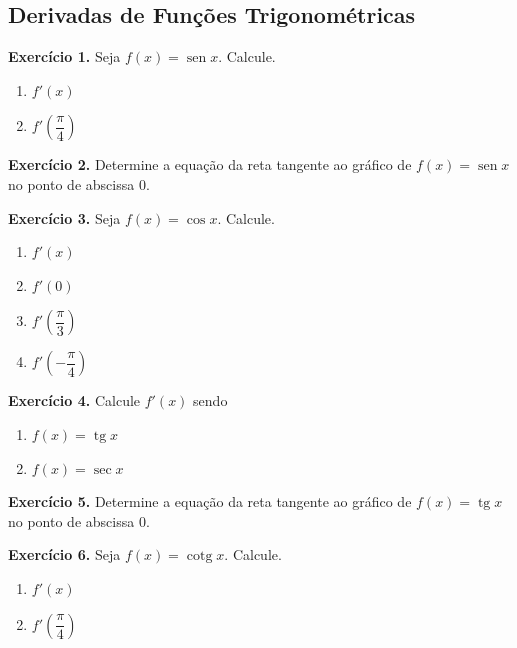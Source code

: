 \documentclass[12pt,a4paper]{article}
\begin{document}
\subsection{Derivadas de Funções Trigonométricas}
\vspace{0.5cm}
\noindent\textbf{Exercício 1.} Seja $f(x) = \operatorname{sen} x$. Calcule.
\begin{enumerate}
    \renewcommand{\theenumi}{\alph{enumi}}
    \renewcommand{\labelenumi}{\theenumi)}
    \item $f'(x)$
    \item $f'\!\left(\dfrac{\pi}{4}\right)$
\end{enumerate}

\vspace{0.5cm}
\noindent\textbf{Exercício 2.}
Determine a equação da reta tangente ao gráfico de $f(x) = \operatorname{sen} x$ no ponto de abscissa 0.

\vspace{0.5cm}
\noindent\textbf{Exercício 3.} Seja $f(x) = \cos x$. Calcule.
\begin{enumerate}
    \renewcommand{\theenumi}{\alph{enumi}}
    \renewcommand{\labelenumi}{\theenumi)}
    \item $f'(x)$
    \item $f'(0)$
    \item $f'\!\left(\dfrac{\pi}{3}\right)$
    \item $f'\!\left(-\dfrac{\pi}{4}\right)$
\end{enumerate}

\vspace{0.5cm}
\noindent\textbf{Exercício 4.} Calcule $f'(x)$ sendo
\begin{enumerate}
    \renewcommand{\theenumi}{\alph{enumi}}
    \renewcommand{\labelenumi}{\theenumi)}
    \item $f(x) = \operatorname{tg} x$
    \item $f(x) = \sec x$
\end{enumerate}

\vspace{0.5cm}
\noindent\textbf{Exercício 5.}
Determine a equação da reta tangente ao gráfico de $f(x) = \operatorname{tg} x$ no ponto de abscissa 0.

\vspace{0.5cm}
\noindent\textbf{Exercício 6.} Seja $f(x) = \operatorname{cotg} x$. Calcule.
\begin{enumerate}
    \renewcommand{\theenumi}{\alph{enumi}}
    \renewcommand{\labelenumi}{\theenumi)}
    \item $f'(x)$
    \item $f'\!\left(\dfrac{\pi}{4}\right)$
\end{enumerate}
\end{document}
